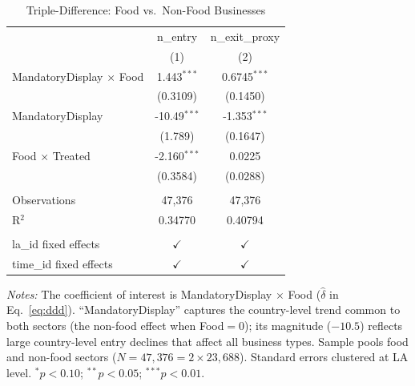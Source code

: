 
\begin{table}[htbp]
   \caption{\label{tab:ddd} Triple-Difference: Food vs.\ Non-Food Businesses}
   \bigskip
   \centering
   \begin{tabular}{lcc}
      \toprule
                                              & n\_entry       & n\_exit\_proxy\\
                                              & (1)            & (2)\\
      \midrule
      MandatoryDisplay $\times$ Food          & 1.443$^{***}$  & 0.6745$^{***}$\\
                                              & (0.3109)       & (0.1450)\\
      MandatoryDisplay                        & -10.49$^{***}$ & -1.353$^{***}$\\
                                              & (1.789)        & (0.1647)\\
      Food $\times$ Treated                   & -2.160$^{***}$ & 0.0225\\
                                              & (0.3584)       & (0.0288)\\
       \\
      Observations                            & 47,376         & 47,376\\
      R$^2$                                   & 0.34770        & 0.40794\\
       \\
      la\_id fixed effects                    & $\checkmark$   & $\checkmark$\\
      time\_id fixed effects                  & $\checkmark$   & $\checkmark$\\
      \bottomrule
   \end{tabular}

   \par \raggedright
   \textit{Notes:} The coefficient of interest is MandatoryDisplay $\times$ Food ($\hat{\delta}$ in Eq.~\ref{eq:ddd}). ``MandatoryDisplay'' captures the country-level trend common to both sectors (the non-food effect when Food$=0$); its magnitude ($-10.5$) reflects large country-level entry declines that affect all business types. Sample pools food and non-food sectors ($N = 47{,}376 = 2 \times 23{,}688$). Standard errors clustered at LA level. $^{*}p<0.10$; $^{**}p<0.05$; $^{***}p<0.01$.
\end{table}

